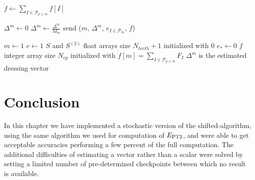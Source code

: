 \documentclass[./thesis.tex]{subfiles}
\begin{document}
\begin{algorithm}
	
	
	$\dot f \gets \sum_{I \in \mathcal{P}_{p\leq m}} f[I]$ \;
	
	$\Delta^m \gets 0$ \;
	$\Delta^m \gets \frac{\Delta^m}{M_m}$ \; 
	send ($m$, $\Delta^m$, $e_{I \in \mathcal{P}_m}$, $\dot f$) \;
\end{algorithm}


\begin{algorithm}
	$m \gets 1$ \;
	$c \gets 1$ \;
	$S$ and $S^{(2)}$ float arrays size $N_{teeth}+1$ initialized with $0$ \;
	$e_* \gets 0$ \;
	$\dot f$ integer array size $N_{cp}$ initialized with $\dot f[m] = \sum_{I \in \mathcal{P}_{p\leq m}} F_{I}$ \;
	$\Delta^m$ is the estimated dressing vector \;
	
\end{algorithm}


\section{Conclusion}

In this chapter we have implemented a stochastic version of the shifted-\Bk algorithm, using the same algorithm we used for computation of $E_\text{PT2}$, and were able to get acceptable accuracies performing a few percent of the full computation.
The additional difficulties of estimating a vector rather than a scalar were solved by setting a limited number of pre-determined checkpoints between which no result is available.
\end{document}
